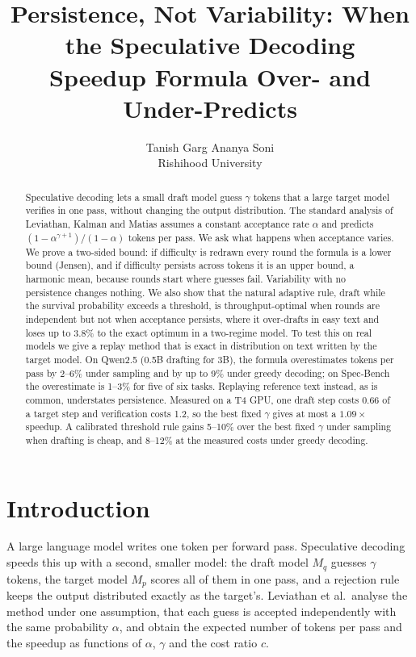 \documentclass[10pt]{article}
\title{\vspace{-1.2cm}Persistence, Not Variability: When the Speculative Decoding\\ Speedup Formula Over- and Under-Predicts}
\author{Tanish Garg \qquad Ananya Soni\\[2pt] \small Rishihood University}
\date{}
\theoremstyle{remark}
\begin{document}
\maketitle
\vspace{-0.8cm}

\begin{abstract}
\noindent Speculative decoding lets a small draft model guess $\gamma$ tokens that a large target model verifies in
one pass, without changing the output distribution. The standard analysis of Leviathan, Kalman and Matias assumes a
constant acceptance rate $\alpha$ and predicts $(1-\alpha^{\gamma+1})/(1-\alpha)$ tokens per pass. We ask what happens
when acceptance varies. We prove a two-sided bound: if difficulty is redrawn every round the formula is a lower bound
(Jensen), and if difficulty persists across tokens it is an upper bound, a harmonic mean, because rounds start where
guesses fail. Variability with no persistence changes nothing. We also show that the natural adaptive rule, draft
while the survival probability exceeds a threshold, is throughput-optimal when rounds are independent but not when
acceptance persists, where it over-drafts in easy text and loses up to 3.8\% to the exact optimum in a two-regime
model. To test this on real models we give a replay method that is exact in distribution on text written by the
target model. On Qwen2.5 (0.5B drafting for 3B), the formula overestimates tokens per pass by 2--6\% under sampling
and by up to 9\% under greedy decoding; on Spec-Bench the overestimate is 1--3\% for five of six tasks. Replaying
reference text instead, as is common, understates persistence. Measured on a T4 GPU, one draft step costs 0.66 of a
target step and verification costs 1.2, so the best fixed $\gamma$ gives at most a $1.09\times$ speedup. A calibrated
threshold rule gains 5--10\% over the best fixed $\gamma$ under sampling when drafting is cheap, and 8--12\% at the
measured costs under greedy decoding.
\end{abstract}

\section{Introduction}

A large language model writes one token per forward pass. Speculative decoding
\cite{leviathan,chen} speeds this up with a second, smaller model: the draft model $M_q$ guesses $\gamma$ tokens,
the target model $M_p$ scores all of them in one pass, and a rejection rule keeps the output distributed exactly as
the target's. Leviathan et al.\ analyse the method under one assumption, that each guess is accepted independently
with the same probability $\alpha$, and obtain the expected number of tokens per pass and the speedup as functions of
$\alpha$, $\gamma$ and the cost ratio $c$.
\end{document}
